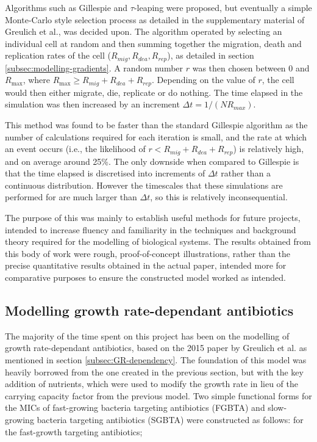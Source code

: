 \documentclass[a4paper,12pt]{article}
\begin{document}
Algorithms such as Gillespie \cite{bioref:Gillespie-algorithm} and $\tau$-leaping \cite{bioref:tau-leap-algorithm} were proposed, but eventually a simple Monte-Carlo style selection 
process as detailed in the supplementary material of Greulich et al., was decided upon.  The algorithm operated by selecting an individual cell at random and then summing together 
the migration, death and replication rates of the cell ($R_{mig}, R_{dea}, R_{rep}$), as detailed in section \ref{subsec:modelling-gradients}.  A random number $r$ was then chosen 
between 0 and $R_{\max}$, where $R_{\max} \geq R_{mig} + R_{dea} + R_{rep}$. Depending on the value of $r$, the cell would then either migrate, die, replicate or do nothing.  The time 
elapsed in the simulation was then increased by an increment $\Delta{t} = 1/(NR_{max})$.  

This method was found to be faster than the standard Gillespie algorithm as the number 
of calculations required for each iteration is small, and the rate at which an event occurs (i.e., the likelihood of $r < R_{mig} + R_{dea} + R_{rep}$) is relatively high, 
and on average around 25\%.  The only downside when compared to Gillespie is that the time elapsed is discretised into increments of $\Delta{t}$ rather than a continuous distribution.  
However the timescales that these simulations are performed for are much larger than $\Delta{t}$, so this is relatively inconsequential.  

The purpose of this was mainly to establish useful methods for future projects, intended to increase fluency and familiarity in the techniques and background 
theory required for the modelling of biological systems.  The results obtained from this body of work were rough, proof-of-concept illustrations, rather than the precise 
quantitative results obtained in the actual paper, intended more for comparative purposes to ensure the constructed model worked as intended.



\subsection{Modelling growth rate-dependant antibiotics}

The majority of the time spent on this project has been on the modelling of growth rate-dependant antibiotics, based on the 2015 paper by Greulich et al. 
\cite{bioref:Greulich-growthDependentAntibiotics} as mentioned in section \ref{subsec:GR-dependency}.  The foundation of this model was heavily borrowed from the one created in the 
previous section, but with the key addition of nutrients, which were used to modify the 
growth rate in lieu of the carrying capacity factor from the previous model.  Two simple functional forms for the MICs of fast-growing bacteria targeting antibiotics (FGBTA)
and slow-growing bacteria targeting antibiotics (SGBTA) were constructed as follows: for the fast-growth targeting antibiotics; 
\end{document}
